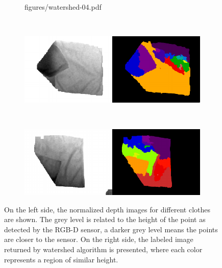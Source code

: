 \begin{figure}[htbp]
\begin{subfigure}[c]{0.7\textwidth}
    	{figures/watershed-04.pdf}
	\end{subfigure}
	~
	\begin{subfigure}[c]{0.7\textwidth}
	    \centering
    	\includegraphics[width=\textwidth]
    	{figures/watershed-05.pdf}
	\end{subfigure}
	~
    \begin{subfigure}[c]{0.7\textwidth}
	    \centering
    	\includegraphics[width=\textwidth]
    	{figures/watershed-06.pdf}
	\end{subfigure} 
    \caption{On the left side, the normalized depth images for different clothes are shown. The grey level is related to the height of the point as detected by the RGB-D sensor, a darker grey level means the points are closer to the sensor. On the right side, the labeled image returned by watershed algorithm is presented, where each color represents a region of similar height.}
    \label{fig:watershed_labels}
\end{figure}

